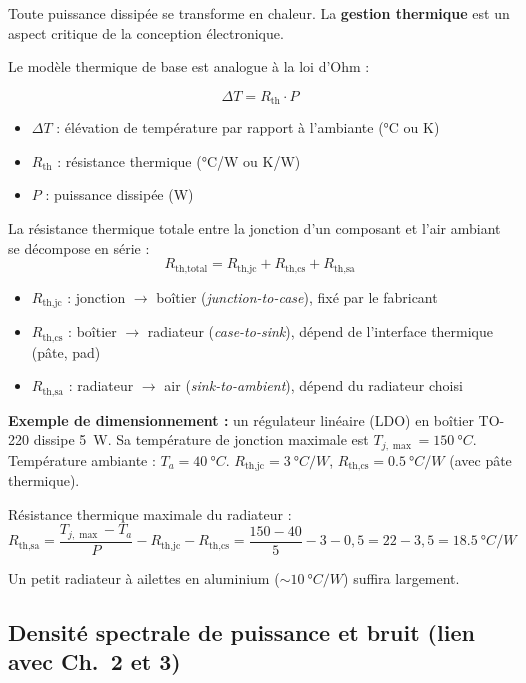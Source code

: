 \documentclass[12pt,a4paper,twoside]{book}
\begin{document}
Toute puissance dissipée se transforme en chaleur. La \textbf{gestion thermique} est un aspect critique de la conception électronique.

Le modèle thermique de base est analogue à la loi d'Ohm :

\begin{formule}
\[
\boxed{\Delta T = R_{\text{th}} \cdot P}
\]
\begin{itemize}[nosep]
\item $\Delta T$ : élévation de température par rapport à l'ambiante (°C ou K)
\item $R_{\text{th}}$ : résistance thermique (°C/W ou K/W)
\item $P$ : puissance dissipée (W)
\end{itemize}
\end{formule}

La résistance thermique totale entre la jonction d'un composant et l'air ambiant se décompose en série :
\[
R_{\text{th,total}} = R_{\text{th,jc}} + R_{\text{th,cs}} + R_{\text{th,sa}}
\]
\begin{itemize}[nosep]
\item $R_{\text{th,jc}}$ : jonction $\to$ boîtier (\textit{junction-to-case}), fixé par le fabricant
\item $R_{\text{th,cs}}$ : boîtier $\to$ radiateur (\textit{case-to-sink}), dépend de l'interface thermique (pâte, pad)
\item $R_{\text{th,sa}}$ : radiateur $\to$ air (\textit{sink-to-ambient}), dépend du radiateur choisi
\end{itemize}

\begin{pratique}
\textbf{Exemple de dimensionnement :} un régulateur linéaire (LDO) en boîtier TO-220 dissipe \SI{5}{W}. Sa température de jonction maximale est $T_{j,\max} = \SI{150}{°C}$. Température ambiante : $T_a = \SI{40}{°C}$. $R_{\text{th,jc}} = \SI{3}{°C/W}$, $R_{\text{th,cs}} = \SI{0.5}{°C/W}$ (avec pâte thermique).

Résistance thermique maximale du radiateur :
\[
R_{\text{th,sa}} = \frac{T_{j,\max} - T_a}{P} - R_{\text{th,jc}} - R_{\text{th,cs}} = \frac{150-40}{5} - 3 - 0{,}5 = 22 - 3{,}5 = \SI{18.5}{°C/W}
\]

Un petit radiateur à ailettes en aluminium ($\sim\SI{10}{°C/W}$) suffira largement.
\end{pratique}

\subsection{Densité spectrale de puissance et bruit (lien avec Ch.\ 2 et 3)}
\end{document}
